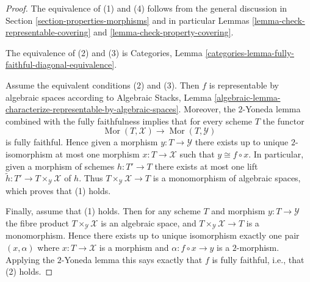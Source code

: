 \documentclass[10pt,a4paper]{amsart}
\theoremstyle{plain}
\theoremstyle{definition}
\theoremstyle{remark}
\numberwithin{equation}{subsection}
\def\Mor{\mathop{\mathrm{Mor}}\nolimits}
\begin{document}
\begin{proof}
The equivalence of (1) and (4) follows from the general discussion in
Section \ref{section-properties-morphisms}
and in particular
Lemmas \ref{lemma-check-representable-covering} and
\ref{lemma-check-property-covering}.

\medskip\noindent
The equivalence of (2) and (3) is
Categories, Lemma \ref{categories-lemma-fully-faithful-diagonal-equivalence}.

\medskip\noindent
Assume the equivalent conditions (2) and (3). Then $f$ is representable
by algebraic spaces according to
Algebraic Stacks,
Lemma \ref{algebraic-lemma-characterize-representable-by-algebraic-spaces}.
Moreover, the $2$-Yoneda lemma combined with the fully faithfulness
implies that for every scheme $T$ the functor
$$
\Mor(T, \mathcal{X})
\longrightarrow
\Mor(T, \mathcal{Y})
$$
is fully faithful. Hence given a morphism $y : T \to \mathcal{Y}$ there exists
up to unique $2$-isomorphism at most one morphism $x : T \to \mathcal{X}$
such that $y \cong f \circ x$. In particular, given a morphism of schemes
$h : T' \to T$ there exists at most one lift
$\tilde h : T' \to T \times_\mathcal{Y} \mathcal{X}$ of $h$.
Thus $T \times_\mathcal{Y} \mathcal{X} \to T$ is a monomorphism of
algebraic spaces, which proves that (1) holds.

\medskip\noindent
Finally, assume that (1) holds. Then for any scheme $T$ and morphism
$y : T \to \mathcal{Y}$ the fibre product $T \times_\mathcal{Y} \mathcal{X}$
is an algebraic space, and $T \times_\mathcal{Y} \mathcal{X} \to T$
is a monomorphism. Hence there exists up to unique isomorphism
exactly one pair $(x, \alpha)$ where $x : T \to \mathcal{X}$ is a morphism
and $\alpha : f \circ x \to y$ is a $2$-morphism. Applying
the $2$-Yoneda lemma this says exactly that $f$ is fully faithful, i.e.,
that (2) holds.
\end{proof}
\end{document}
